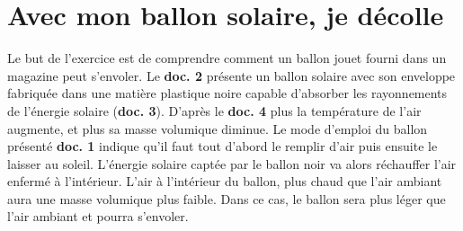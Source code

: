 \section{Avec mon ballon solaire, je décolle}

	Le but de l'exercice est de comprendre comment un ballon jouet fourni dans un magazine peut s'envoler.
	Le \textbf{doc. 2} présente un ballon solaire avec son enveloppe fabriquée dans une matière plastique noire capable d'absorber les rayonnements de l'énergie solaire (\textbf{doc. 3}).
	D'après le \textbf{doc. 4} plus la température de l'air augmente, et plus sa masse volumique diminue.
	Le mode d'emploi du ballon présenté \textbf{doc. 1} indique qu'il faut tout d'abord le remplir d'air puis ensuite le laisser au soleil.
	L'énergie solaire captée par le ballon noir va alors réchauffer l'air enfermé à l'intérieur. 
	L'air à l'intérieur du ballon, plus chaud que l'air ambiant aura une masse volumique plus faible.
	Dans ce cas, le ballon sera plus léger que l'air ambiant et pourra s'envoler.
	
